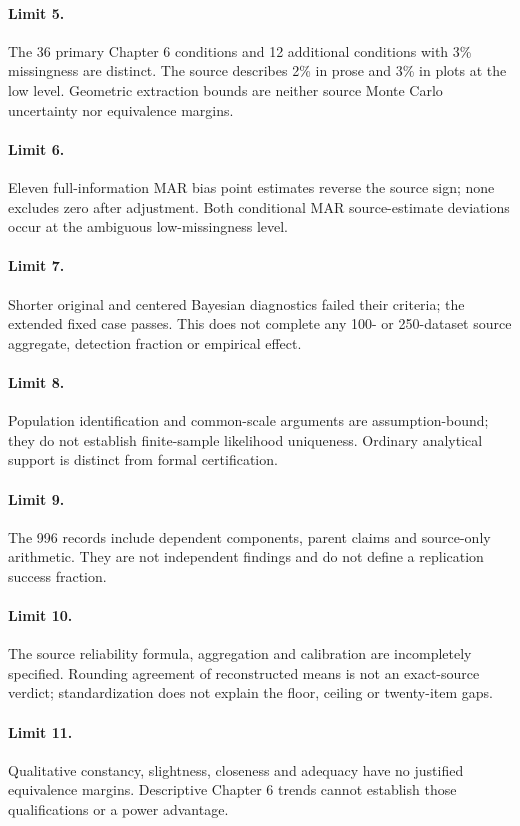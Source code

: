 \documentclass[11pt]{article}
\begin{document}
\paragraph{Limit 5.} The 36 primary Chapter 6 conditions and 12 additional conditions with 3\% missingness are distinct. The source describes 2\% in prose and 3\% in plots at the low level. Geometric extraction bounds are neither source Monte Carlo uncertainty nor equivalence margins.
\paragraph{Limit 6.} Eleven full-information MAR bias point estimates reverse the source sign; none excludes zero after adjustment. Both conditional MAR source-estimate deviations occur at the ambiguous low-missingness level.
\paragraph{Limit 7.} Shorter original and centered Bayesian diagnostics failed their criteria; the extended fixed case passes. This does not complete any 100- or 250-dataset source aggregate, detection fraction or empirical effect.
\paragraph{Limit 8.} Population identification and common-scale arguments are assumption-bound; they do not establish finite-sample likelihood uniqueness. Ordinary analytical support is distinct from formal certification.
\paragraph{Limit 9.} The 996 records include dependent components, parent claims and source-only arithmetic. They are not independent findings and do not define a replication success fraction.
\paragraph{Limit 10.} The source reliability formula, aggregation and calibration are incompletely specified. Rounding agreement of reconstructed means is not an exact-source verdict; standardization does not explain the floor, ceiling or twenty-item gaps.
\paragraph{Limit 11.} Qualitative constancy, slightness, closeness and adequacy have no justified equivalence margins. Descriptive Chapter 6 trends cannot establish those qualifications or a power advantage.
\end{document}

